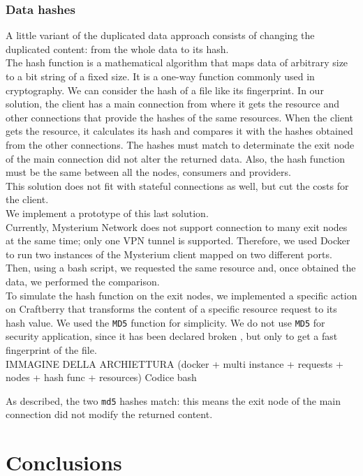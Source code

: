 \documentclass[12pt]{article}
\begin{document}
		\subsubsection{Data hashes}
		A little variant of the duplicated data approach consists of changing the duplicated content: from the whole data to its hash.\\
		The hash function is a mathematical algorithm that maps data of arbitrary size to a bit string of a fixed size. It is a one-way function commonly used in cryptography. We can consider the hash of a file like its fingerprint. In our solution, the client has a main connection from where it gets the resource and other connections that provide the hashes of the same resources. When the client gets the resource, it calculates its hash and compares it with the hashes obtained from the other connections. The hashes must match to determinate the exit node of the main connection did not alter the returned data. Also, the hash function must be the same between all the nodes, consumers and providers.\\
		\bigbreak
		This solution does not fit with stateful connections as well, but cut the costs for the client.\\
		\bigbreak
		We implement a prototype of this last solution.\\
		Currently, Mysterium Network does not support connection to many exit nodes at the same time; only one VPN tunnel is supported. Therefore, we used Docker to run two instances of the Mysterium client mapped on two different ports. Then, using a bash script, we requested the same resource and, once obtained the data, we performed the comparison.\\
		To simulate the hash function on the exit nodes, we implemented a specific action on Craftberry that transforms the content of a specific resource request to its hash value. We used the \lstinline{MD5} function for simplicity. We do not use \lstinline{MD5} for security application, since it has been declared broken \cite{MD5hash}, but only to get a fast fingerprint of the file.\\
		\bigbreak
		IMMAGINE DELLA ARCHIETTURA (docker +  multi instance + requests + nodes + hash func + resources)
		\bigbreak
		Codice bash
		\bigbreak
		
		As described, the two \lstinline{md5} hashes match: this means the exit node of the main connection did not modify the returned content.

	\newpage
	\section{Conclusions}
\end{document}
